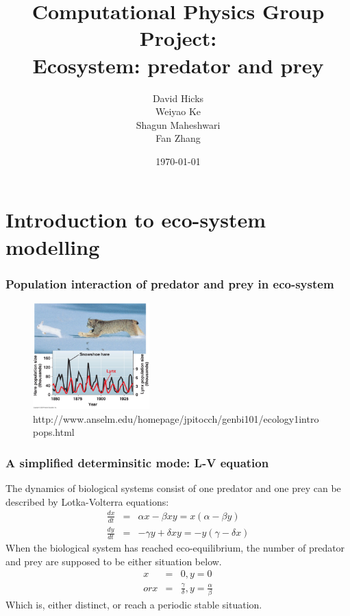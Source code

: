 \documentclass{beamer}
\title{Computational Physics Group Project: \\ Ecosystem: predator and prey}
\author{David Hicks\\ Weiyao Ke \\ Shagun Maheshwari \\ Fan Zhang}
\date{\today}
\begin{document}
\frame{\titlepage}

\section[Outline]{}
\frame{\tableofcontents}

\section{Introduction to eco-system modelling}

\frame
{
 	\frametitle{Population interaction of predator and prey in eco-system}
 
	\begin{figure}[htbp]
	\begin{center}
		\includegraphics[width=0.4\textwidth]{./pics/predator_prey2.jpeg}
	\caption{http://www.anselm.edu/homepage/jpitocch/genbi101/ecology1intropops.html}
	\label{default}
	\end{center}
	\end{figure}  
}

\frame
{
 \frametitle{A simplified determinsitic mode: L-V equation}
 The dynamics of biological systems consist of one predator and one prey can be described by Lotka-Volterra equations:
 \begin{eqnarray*}
 \frac{dx}{dt} &=& \alpha x - \beta x y = x(\alpha - \beta y) \\
 \frac{dy}{dt} &=& - \gamma y + \delta x y = - y (\gamma - \delta x)
 \end{eqnarray*}
 When the biological system has reached eco-equilibrium, the number of predator and prey are supposed to be either situation below.
 \begin{eqnarray*}
 x &=& 0, y = 0 \\
 or x &=& \frac{\gamma}{\delta}, y = \frac{\alpha}{\beta}
 \end{eqnarray*}
 Which is, either distinct, or reach a periodic stable situation.
}
\end{document}
